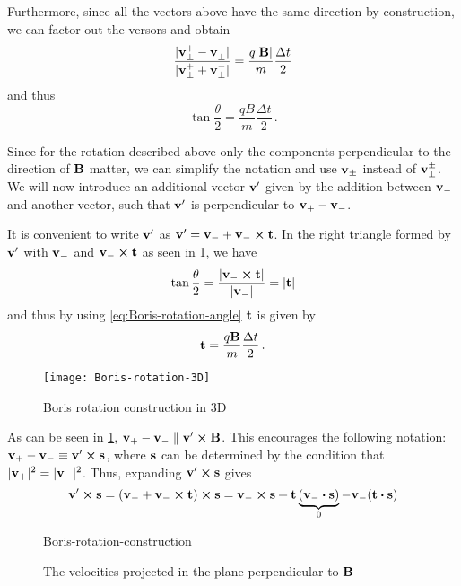 \documentclass[12pt, class=report, crop=false]{standalone}
\begin{document}
Furthermore, since all the vectors above have the same direction by construction,
we can factor out the versors and obtain
\[
\frac{|\vb{v}^+_\perp - \vb{v}^-_\perp|}{|\vb{v}^+_\perp + \vb{v}^-_\perp|} =
\frac{q |\vb{B}|}{m} \frac{\Delta t}{2}
\]
and thus
\begin{equation}
  \label{eq:Boris-rotation-angle}
  \tan{\frac{\theta}{2}} = \frac{q B}{m} \frac{\Delta t}{2}\,.
\end{equation}

Since for the rotation described above only the components perpendicular to
the direction of \(\vb{B}\) matter, we can simplify the notation and use
\(\vb{v}_\pm\) instead of \(\vb{v}^\pm_\perp\).
We will now introduce an additional vector \(\vb{v}'\) given by the addition
between \(\vb{v}_-\) and another vector, such that \(\vb{v}'\) is perpendicular
to \(\vb{v}_+ - \vb{v}_-\).

It is convenient to write \(\vb{v}'\) as \(\vb{v}' = \vb{v}_- + \vb{v}_- \cp \vb{t}\).
In the right triangle formed by \(\vb{v}'\) with \(\vb{v}_-\)
and \(\vb{v}_- \cp \vb{t}\) as seen in \cref{fig:Boris-rotation-3D},
we have
\[
\tan{\frac{\theta}{2}} = \frac{|\vb{v}_- \cp \vb{t}|}{|\vb{v}_-|} = |\vb{t}|
\]
and thus by using \cref{eq:Boris-rotation-angle} \(\vb{t}\) is given by
\[
\vb{t} = \frac{q \vb{B}}{m} \frac{\Delta t}{2}\,.
\]

\begin{figure}[H]
  \texttt{[image: Boris-rotation-3D]}
  \caption{Boris rotation construction in 3D}%
  \label{fig:Boris-rotation-3D}%
\end{figure}

As can be seen in \cref{fig:Boris-rotation-3D},
\(\vb{v}_+ - \vb{v}_- \parallel \vb{v}' \cp \vb{B}\). This encourages
the following notation: \(\vb{v}_+ - \vb{v}_- \equiv \vb{v}' \cp \vb{s}\),
where \(\vb{s}\) can be determined by the condition that
\(|\vb{v}_+|^2 = |\vb{v}_-|^2\). Thus, expanding \(\vb{v}' \cp \vb{s}\) gives
\[
\vb{v}' \cp \vb{s} = (\vb{v}_- + \vb{v}_- \cp \vb{t}) \cp \vb{s} =
\vb{v}_- \cp \vb{s} + \vb{t} \underbrace{(\vb{v}_- \vdot \vb{s})}_0 - \vb{v}_- (\vb{t} \vdot \vb{s})
\]

\begin{wrapfigure}[15]{r}{0.4\textwidth}
  \centering
  {Boris-rotation-construction}%
  \caption{The velocities projected in the plane perpendicular to \(\vb{B}\)}\label{fig:Boris-rotation-construction}%
\end{wrapfigure}
\end{document}
